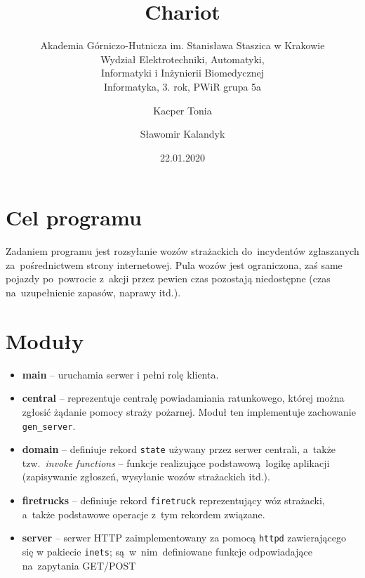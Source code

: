 \documentclass{article}
\title{Chariot}
\subtitle{Akademia Górniczo-Hutnicza im. Stanisława Staszica w Krakowie\\
	Wydział Elektrotechniki, Automatyki,\\
	Informatyki i Inżynierii Biomedycznej\\
	Informatyka, 3. rok, PWiR grupa 5a}
\author{Kacper Tonia\and
		Sławomir Kalandyk}
\date{22.01.2020}
\begin{document}
\maketitle

\section{Cel programu}
Zadaniem programu jest rozsyłanie wozów strażackich do~incydentów zgłaszanych za~pośrednictwem strony internetowej. Pula wozów jest ograniczona, zaś same pojazdy po~powrocie z~akcji przez pewien czas pozostają niedostępne (czas na~uzupełnienie zapasów, naprawy itd.).
\section{Moduły}
\begin{itemize}
	\item \textbf{main} -- uruchamia serwer i pełni rolę klienta.
	\item \textbf{central} -- reprezentuje centralę powiadamiania ratunkowego, której można zgłosić żądanie pomocy straży pożarnej. Moduł ten implementuje zachowanie \texttt{gen\_server}.
	\item \textbf{domain} -- definiuje rekord \texttt{state} używany przez serwer centrali, a~także tzw.~\emph{invoke functions} -- funkcje realizujące podstawową logikę aplikacji (zapisywanie zgłoszeń, wysyłanie wozów strażackich itd.).
	\item \textbf{firetrucks} -- definiuje rekord \texttt{firetruck} reprezentujący wóz strażacki, a~także podstawowe operacje z~tym rekordem związane.
	\item \textbf{server} -- serwer HTTP zaimplementowany za pomocą \texttt{httpd} zawierającego się w pakiecie \texttt{inets}; są~w~nim~definiowane funkcje odpowiadające na~zapytania GET/POST
\end{itemize}
\end{document}

